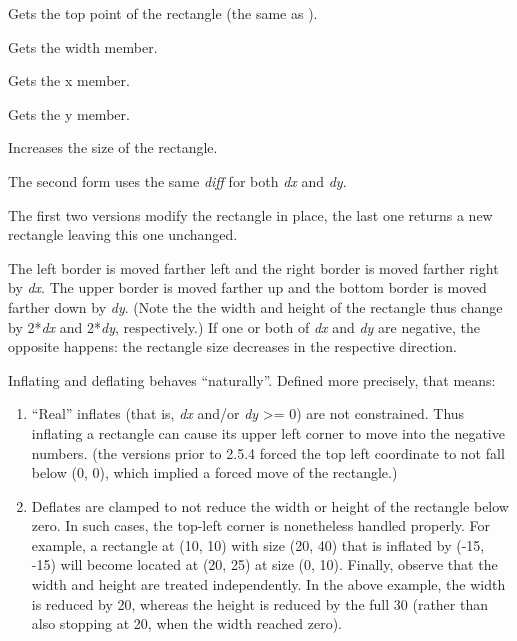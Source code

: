 
Gets the top point of the rectangle (the same as ).


\label{wxrectgetwidth}


Gets the width member.


\label{wxrectgetx}


Gets the x member.


\label{wxrectgety}


Gets the y member.


\label{wxrectinflate}




Increases the size of the rectangle.

The second form uses the same {\it diff} for both {\it dx} and {\it dy}.

The first two versions modify the rectangle in place, the last one returns a
new rectangle leaving this one unchanged.

The left border is moved farther left and the right border is moved farther
right by {\it dx}. The upper border is moved farther up and the bottom border
is moved farther down by {\it dy}. (Note the the width and height of the
rectangle thus change by 2*{\it dx} and 2*{\it dy}, respectively.) If one or
both of {\it dx} and {\it dy} are negative, the opposite happens: the rectangle
size decreases in the respective direction.

Inflating and deflating behaves ``naturally''. Defined more precisely, that
means:
\begin{enumerate}
    \item ``Real'' inflates (that is, {\it dx} and/or {\it dy} >= 0) are not
        constrained. Thus inflating a rectangle can cause its upper left corner
        to move into the negative numbers. (the versions prior to 2.5.4 forced
        the top left coordinate to not fall below (0, 0), which implied a
        forced move of the rectangle.)

    \item Deflates are clamped to not reduce the width or height of the
        rectangle below zero. In such cases, the top-left corner is nonetheless
        handled properly. For example, a rectangle at (10, 10) with size (20,
        40) that is inflated by (-15, -15) will become located at (20, 25) at
        size (0, 10). Finally, observe that the width and height are treated
        independently. In the above example, the width is reduced by 20,
        whereas the height is reduced by the full 30 (rather than also stopping
        at 20, when the width reached zero).
\end{enumerate}

